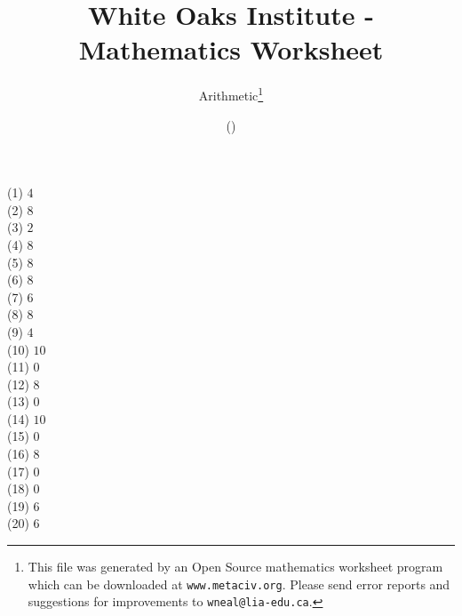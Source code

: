 \documentclass[letter]{article}
\begin{document}
\title{White Oaks Institute - Mathematics Worksheet}
\author{Arithmetic\thanks{This file was generated by an \textsf{Open Source} mathematics worksheet program which can be downloaded at \texttt{www.metaciv.org}. Please send error reports and suggestions for improvements to \texttt{wneal@lia-edu.ca}.}}
\date{\XCfileversion{} (\XCfiledate)}
\maketitle
\setlength{\parskip}{12mm plus 4mm minus 4mm}\setlength{\parindent}{0cm}\begin{multicols}{2}(1) $4$\\(2) $8$\\(3) $2$\\(4) $8$\\(5) $8$\\(6) $8$\\(7) $6$\\(8) $8$\\(9) $4$\\(10) $10$\\(11) $0$\\(12) $8$\\(13) $0$\\(14) $10$\\(15) $0$\\(16) $8$\\(17) $0$\\(18) $0$\\(19) $6$\\(20) $6$\\\end{multicols}
\end{document}
